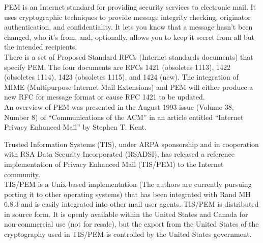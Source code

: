 \begin{htmllist}
    
    PEM is an Internet standard for providing security services to
    electronic mail. It uses cryptographic techniques to provide message
    integrity checking, originator authentication, and confidentiality. It
    lets you know that a message hasn't been changed, who it's from, and,
    optionally, allows you to keep it secret from all but the intended
    recipients.\\
    
    There is a set of Proposed Standard RFCs (Internet standards documents)
    that specify PEM. The four documents are RFCs 1421 (obsoletes 1113),
    1422 (obsoletes 1114), 1423 (obsoletes 1115), and 1424 (new). The
    integration of MIME (Multipurpose Internet Mail Extensions) and PEM
    will either produce a new RFC for message format or cause RFC 1421 to
    be updated.\\
    
    An overview of PEM was presented in the August 1993 issue (Volume 38,
    Number 8) of ``Communications of the ACM'' in an article entitled
    ``Internet Privacy Enhanced Mail'' by Stephen T. Kent.\\

    
    Trusted Information Systems (TIS), under ARPA sponsorship and in
    cooperation with RSA Data Security Incorporated (RSADSI), has released
    a reference implementation of Privacy Enhanced Mail (TIS/PEM) to the
    Internet community.\\
    
    TIS/PEM is a Unix-based implementation (The authors are currently
    pursuing porting it to other operating systems) that has been
    integrated with Rand MH 6.8.3 and is easily integrated into other mail
    user agents. TIS/PEM is distributed in source form. It is openly
    available within the United States and Canada for non-commercial use
    (not for resale), but the export from the United States of the
    cryptography used in TIS/PEM is controlled by the United States
    government.\\

    

\end{htmllist}
